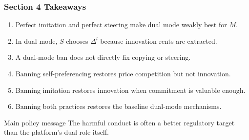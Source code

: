 \begin{frame}
  \frametitle{Section 4 Takeaways}
  \small
  \begin{enumerate}
    \item Perfect imitation and perfect steering make dual mode weakly best for $M$.
    \item In dual mode, $S$ chooses $\Delta^l$ because innovation rents are extracted.
    \item A dual-mode ban does not directly fix copying or steering.
    \item Banning self-preferencing restores price competition but not innovation.
    \item Banning imitation restores innovation when commitment is valuable enough.
    \item Banning both practices restores the baseline dual-mode mechanisms.
  \end{enumerate}

  \begin{alertblock}{Main policy message}
    The harmful conduct is often a better regulatory target than the platform's
    dual role itself.
  \end{alertblock}
\end{frame}
